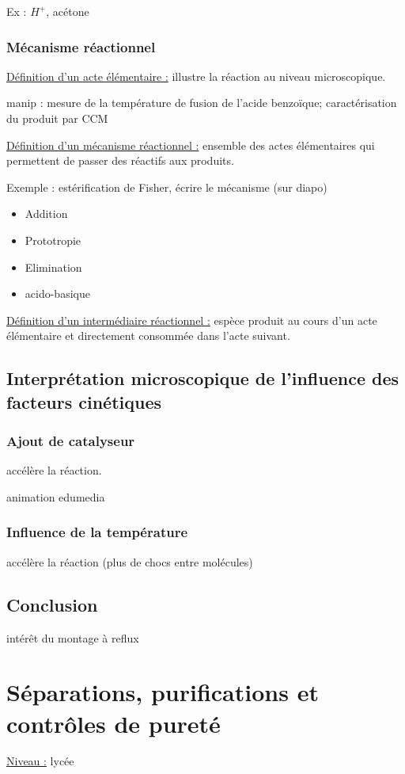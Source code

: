 \documentclass{article}%
\begin{document}
Ex : $H^+$, acétone

\subsubsection{Mécanisme réactionnel}
\underline{Définition d'un acte élémentaire :} illustre la réaction au niveau microscopique.

manip : mesure de la température de fusion de l'acide benzoïque; caractérisation du produit par CCM

\underline{Définition d'un mécanisme réactionnel :} ensemble des actes élémentaires qui permettent de passer des réactifs aux produits.

Exemple : estérification de Fisher, écrire le mécanisme (sur diapo)

\begin{itemize}
	\item Addition
	\item Prototropie
	\item Elimination
	\item acido-basique
\end{itemize}

\underline{Définition d'un intermédiaire réactionnel :} espèce produit au cours d'un acte élémentaire et directement consommée dans l'acte suivant.

\subsection{Interprétation microscopique de l'influence des facteurs cinétiques}
\subsubsection{Ajout de catalyseur}
accélère la réaction.

animation edumedia
\subsubsection{Influence de la température}
accélère la réaction (plus de chocs entre molécules)

\subsection{Conclusion} 

intérêt du montage à reflux
\section{Séparations, purifications et contrôles de pureté}
\underline{Niveau :} lycée
\end{document}
